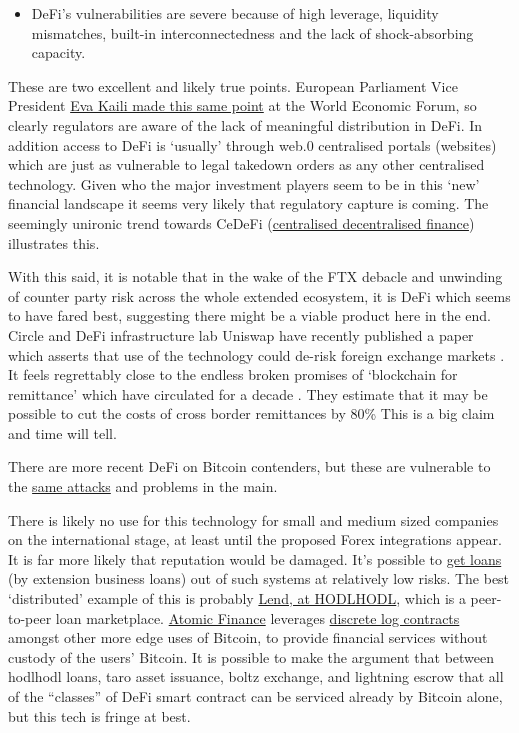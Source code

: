 \begin{itemize}
\begin{itemize}
\item DeFi’s vulnerabilities are severe because of high leverage, liquidity mismatches, built-in interconnectedness and the lack of shock-absorbing capacity.
\end{itemize}
These are two excellent and likely true points. European Parliament Vice President \href{https://cointelegraph.com/news/wef-2022-most-defi-protocols-aren-t-really-decentralized-says-european-parliament-vp?}{Eva Kaili made this same point} at the World Economic Forum, so clearly regulators are aware of the lack of meaningful distribution in DeFi. In addition access to DeFi is `usually' through web.0 centralised portals (websites) which are just as vulnerable to legal takedown orders as any other centralised technology. Given who the major investment players seem to be in this `new' financial landscape it seems very likely that regulatory capture is coming. The seemingly unironic trend towards CeDeFi (\href{https://www.nasdaq.com/articles/cedefi-what-it-is-and-why-it-matters}{centralised decentralised finance}) illustrates this.\par
With this said, it is notable that in the wake of the FTX debacle and unwinding of counter party risk across the whole extended ecosystem, it is DeFi which seems to have fared best, suggesting there might be a viable product here in the end. Circle and DeFi infrastructure lab Uniswap have recently published a paper which asserts that use of the technology could de-risk foreign exchange markets \cite{Adams2023}. It feels regrettably close to the endless broken promises of `blockchain for remittance' which have circulated for a decade \cite{sood2019implementation, bechtel2022future}. They estimate that it may be possible to cut the costs of cross border remittances by 80\% This is a big claim and time will tell.\par 
There are more recent DeFi on Bitcoin contenders, but these are vulnerable to the \href{https://bisq.community/t/trading-halted-until-v1-3-0-hotfix/9208}{same attacks} and problems in the main. \par 
There is likely no use for this technology for small and medium sized companies on the international stage, at least until the proposed Forex integrations appear. It is far more likely that reputation would be damaged. It's possible to \href{https://www.coindesk.com/layer2/2022/07/20/the-credit-crunch-is-not-the-end-of-crypto-lending/}{get loans} (by extension business loans) out of such systems at relatively low risks. The best `distributed' example of this is probably \href{https://lend.hodlhodl.com/}{Lend, at HODLHODL}, which is a peer-to-peer loan marketplace. \href{https://atomic.finance/blog/a-laypersons-guide-to-discreet-log-contracts-atomic-yield-series-part-3/}{Atomic Finance} leverages \href{https://adiabat.github.io/dlc.pdf}{discrete log contracts} amongst other more edge uses of Bitcoin, to provide financial services without custody of the users' Bitcoin. It is possible to make the argument that between hodlhodl loans, taro asset issuance, boltz exchange, and lightning escrow that all of the ``classes'' of DeFi smart contract can be serviced already by Bitcoin alone, but this tech is fringe at best.\par

\end{itemize}
